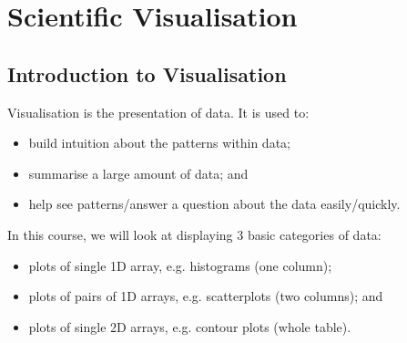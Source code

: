 \documentclass[a4paper, openany]{memoir}
\begin{document}
\chapter{Scientific Visualisation}
\section{Introduction to Visualisation}
Visualisation is the presentation of data. It is used to:
\begin{itemize}
    \item build intuition about the patterns within data;
    \item summarise a large amount of data; and
    \item help see patterns/answer a question about the data easily/quickly.
\end{itemize}
In this course, we will look at displaying 3 basic categories of data:
\begin{itemize}
    \item plots of single 1D array, e.g. histograms (one column);
    \item plots of pairs of 1D arrays, e.g. scatterplots (two columns); and
    \item plots of single 2D arrays, e.g. contour plots (whole table).
\end{itemize}
\end{document}
